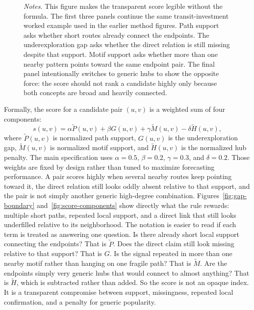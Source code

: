 \documentclass[11pt]{article}
\newcommand{\fignotes}[1]{\caption*{\textit{Notes.} #1}}
\begin{document}
\begin{figure}[t]
  \fignotes{This figure makes the transparent score legible without the formula. The first three panels continue the same transit-investment worked example used in the earlier method figures. Path support asks whether short routes already connect the endpoints. The underexploration gap asks whether the direct relation is still missing despite that support. Motif support asks whether more than one nearby pattern points toward the same endpoint pair. The final panel intentionally switches to generic hubs to show the opposite force: the score should not rank a candidate highly only because both concepts are broad and heavily connected.}
\end{figure}

Formally, the score for a candidate pair \((u,v)\) is a weighted sum of four components:
\[
s(u,v)=\alpha \tilde P(u,v)+\beta G(u,v)+\gamma \tilde M(u,v)-\delta \tilde H(u,v),
\]
where \(\tilde P(u,v)\) is normalized path support, \(G(u,v)\) is the underexploration gap,
\(\tilde M(u,v)\) is normalized motif support, and \(\tilde H(u,v)\) is the normalized hub
penalty. The main specification uses \(\alpha=0.5\), \(\beta=0.2\), \(\gamma=0.3\), and
\(\delta=0.2\). Those
weights are fixed by design rather than tuned to maximize forecasting
performance. A pair scores highly when several nearby routes keep pointing toward it, the
direct relation still looks oddly absent relative to that support, and the pair is not
simply another generic high-degree combination. Figures~\ref{fig:gap-boundary}
and~\ref{fig:score-components} show directly what the rule rewards: multiple short paths,
repeated local support, and a direct link that still looks underfilled relative to its
neighborhood.
The notation is easier to read if each term is treated as answering one question. Is there
already short local support connecting the endpoints? That is \(\tilde P\). Does the direct
claim still look missing relative to that support? That is \(G\). Is the signal repeated in
more than one nearby motif rather than hanging on one fragile path? That is \(\tilde M\). Are
the endpoints simply very generic hubs that would connect to almost anything? That is
\(\tilde H\), which is subtracted rather than added. So the score is not an opaque index. It is
a transparent compromise between support, missingness, repeated local confirmation, and a
penalty for generic popularity.
\end{document}
